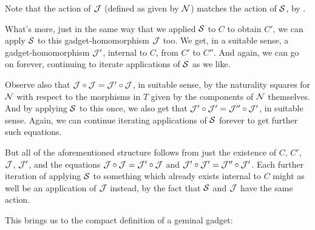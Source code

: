 \begin{observation}
Note that the action of $\mathcal{J}$ (defined as given by $\mathcal{N}$) matches the action of $\mathcal{S}$, by .

What's more, just in the same way that we applied $\mathcal{S}$ to $C$ to obtain $C'$, we can apply $\mathcal{S}$ to this gadget-homomorphism $\mathcal{J}$ too. We get, in a suitable sense, a gadget-homomorphism $\mathcal{J}'$, internal to $C$, from $C'$ to $C''$. And again, we can go on forever, continuing to iterate applications of $\mathcal{S}$ as we like.

Observe also that $\mathcal{J} \circ \mathcal{J} = \mathcal{J}' \circ \mathcal{J}$, in suitable sense, by the naturality squares for $\mathcal{N}$ with respect to the morphisms in $T$ given by the components of $\mathcal{N}$ themselves. And by applying $\mathcal{S}$ to this once, we also get that $\mathcal{J}' \circ \mathcal{J}' = \mathcal{J}'' \circ \mathcal{J}'$, in suitable sense. Again, we can continue iterating applications of $\mathcal{S}$ forever to get further such equations.

But all of the aforementioned structure follows from just the existence of $C$, $C'$, $\mathcal{J}$, $\mathcal{J}'$, and the equations $\mathcal{J} \circ \mathcal{J} = \mathcal{J}' \circ \mathcal{J}$ and $\mathcal{J}' \circ \mathcal{J}' = \mathcal{J}'' \circ \mathcal{J}'$. Each further iteration of applying $\mathcal{S}$ to something which already exists internal to $C$ might as well be an application of $\mathcal{J}$ instead, by the fact that $\mathcal{S}$ and $\mathcal{J}$ have the same action.
\end{observation}

This brings us to the compact definition of a geminal gadget:

